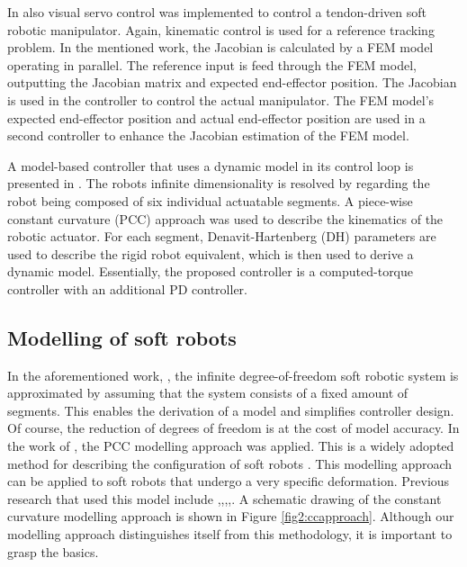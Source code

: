 In \cite{zhang2017visual} also visual servo control was implemented to control a tendon-driven soft robotic manipulator. Again, kinematic control is used for a reference tracking problem. In the mentioned work, the Jacobian is calculated by a FEM model operating in parallel. The reference input is feed through the FEM model, outputting the Jacobian matrix and expected end-effector position. The Jacobian is used in the controller to control the actual manipulator. The FEM model's expected end-effector position and actual end-effector position are used in a second controller to enhance the Jacobian estimation of the FEM model.

A model-based controller that uses a dynamic model in its control loop is presented in \cite{della2020model}. The robots infinite dimensionality is resolved by regarding the robot being composed of six individual actuatable segments. A piece-wise constant curvature (PCC) approach was used to describe the kinematics of the robotic actuator. For each segment, Denavit-Hartenberg (DH) parameters are used to describe the rigid robot equivalent, which is then used to derive a dynamic model. Essentially, the proposed controller is a computed-torque controller with an additional PD controller. 

\subsection*{Modelling of soft robots}

In the aforementioned work, \cite{della2020model}, the infinite degree-of-freedom soft robotic system is approximated by assuming that the system consists of a fixed amount of segments. This enables the derivation of a model and simplifies controller design. Of course, the reduction of degrees of freedom is at the cost of model accuracy. In the work of \cite{della2020model}, the PCC modelling approach was applied. This is a widely adopted method for describing the configuration of soft robots \cite{ccapproach}. This modelling approach can be applied to soft robots that undergo a very specific deformation. Previous research that used this model include \cite{mahl2014bhakin},\cite{ccapproach},\cite{berkers},\cite{Falkenhahn2015},\cite{runge2017framework}. A schematic drawing of the constant curvature modelling approach is shown in Figure \ref{fig2:ccapproach}. Although our modelling approach distinguishes itself from this methodology, it is important to grasp the basics. 


